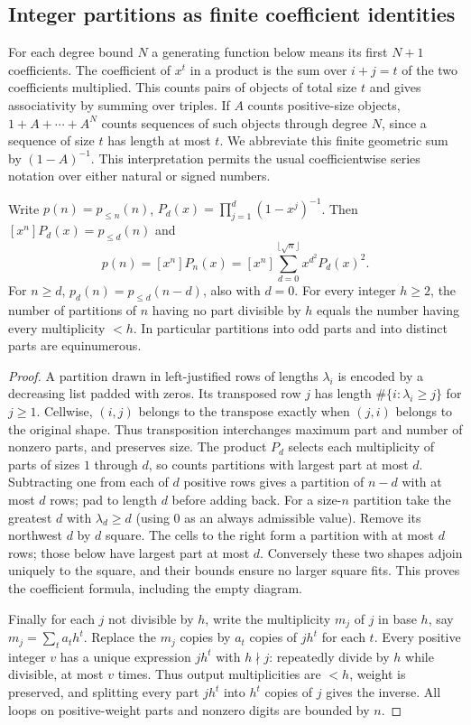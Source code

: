 \subsection{Integer partitions as finite coefficient identities}
For each degree bound $N$ a generating function below means its first
$N+1$ coefficients. The coefficient of $x^t$ in a product is the sum
over $i+j=t$ of the two coefficients multiplied. This counts pairs of
objects of total size $t$ and gives associativity by summing over triples.
If $A$ counts positive-size objects, $1+A+\cdots+A^N$ counts sequences of
such objects through degree $N$, since a sequence of size $t$ has length
at most $t$. We abbreviate this finite geometric sum by $(1-A)^{-1}$.
This interpretation permits the usual coefficientwise series notation over
either natural or signed numbers.

\begin{theorem}\label{result09}
Write $p(n)=p_{\le n}(n)$, $P_d(x)=\prod_{j=1}^d(1-x^j)^{-1}$.
Then $[x^n]P_d(x)=p_{\le d}(n)$ and
\[
 p(n)=[x^n]P_n(x)
     =[x^n]\sum_{d=0}^{\lfloor\sqrt n\rfloor}x^{d^2}P_d(x)^2 .
\]
For $n\ge d$, $p_d(n)=p_{\le d}(n-d)$, also with $d=0$.
For every integer $h\ge2$, the number of partitions of $n$ having no
part divisible by $h$ equals the number having every multiplicity $<h$.
In particular partitions into odd parts and into distinct parts are
equinumerous.
\end{theorem}
\begin{proof}
A partition drawn in left-justified rows of lengths $\lambda_i$ is encoded
by a decreasing list padded with zeros. Its transposed row $j$ has length
$\#\{i:\lambda_i\ge j\}$ for $j\ge1$. Cellwise, $(i,j)$ belongs to
the transpose exactly when $(j,i)$ belongs to the original shape. Thus
transposition interchanges maximum part and number of nonzero parts, and
preserves size. The product $P_d$ selects each multiplicity of parts of
sizes $1$ through $d$, so counts partitions with largest part at most $d$.
Subtracting one from each of $d$ positive rows gives a partition of $n-d$
with at most $d$ rows; pad to length $d$ before adding back.
For a size-$n$ partition take the greatest $d$ with $\lambda_d\ge d$
(using $0$ as an always admissible value). Remove its northwest $d$ by $d$
square. The cells to the right form a partition with at most $d$ rows;
those below have largest part at most $d$. Conversely these two shapes
adjoin uniquely to the square, and their bounds ensure no larger square
fits. This proves the coefficient formula, including the empty diagram.

Finally for each $j$ not divisible by $h$, write the multiplicity $m_j$
of $j$ in base $h$, say $m_j=\sum_t a_t h^t$. Replace the $m_j$ copies by
$a_t$ copies of $jh^t$ for each $t$. Every positive integer $v$ has a
unique expression $jh^t$ with $h\nmid j$: repeatedly divide by $h$ while
divisible, at most $v$ times. Thus output multiplicities are $<h$, weight
is preserved, and splitting every part $jh^t$ into $h^t$ copies of $j$
gives the inverse. All loops on positive-weight parts and nonzero digits
are bounded by $n$.
\end{proof}

